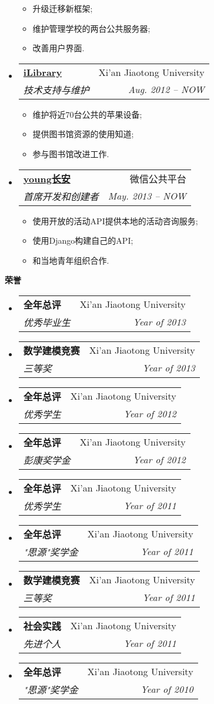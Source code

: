\documentclass[letterpaper,11pt]{article}
\makeatletter
\newcommand{\resitem}[1]{\item #1 \vspace{-2pt}}
\newcommand{\resheading}[1]{{\large \colorbox{mygrey}{\begin{minipage}{\textwidth}{\textbf{#1 \vphantom{p\^{E}}}}\end{minipage}}}}
\newcommand{\ressubheading}[4]{
\begin{tabular*}{6.5in}{l@{\extracolsep{\fill}}r}
		\textbf{#1} & #2 \\
		\textit{#3} & \textit{#4} \\
\end{tabular*}\vspace{-6pt}}
\makeatother
\begin{document}
\begin{CJK}{UTF8}{gbsn}
\begin{itemize}
				{ \footnotesize
				\begin{itemize}
					\resitem{升级迁移新框架;}
					\resitem{维护管理学校的两台公共服务器;}
					\resitem{改善用户界面.}
				\end{itemize}
				}
		\item 
			\ressubheading{\href{http://www.lib.xjtu.edu.cn/}{iLibrary}}{Xi'an Jiaotong University}{技术支持与维护}{Aug. 2012 -- NOW}
				{ \footnotesize
				\begin{itemize}
					\resitem{维护将近70台公共的苹果设备;}
					\resitem{提供图书馆资源的使用知道;}
					\resitem{参与图书馆改进工作.}
				\end{itemize}
				}
		\item 
			\ressubheading{\href{http://nanyang.xjtu.edu.cn/WeChat/note.html}{young长安}}{微信公共平台}{首席开发和创建者}{May. 2013 -- NOW}
				{ \footnotesize
				\begin{itemize}
					\resitem{使用开放的活动API提供本地的活动咨询服务;}
					\resitem{使用Django构建自己的API;}
					\resitem{和当地青年组织合作.}
				\end{itemize}
				}
	\end{itemize}	
	
\resheading{荣誉}
	\begin{itemize}
		\item
			\ressubheading{全年总评}{Xi'an Jiaotong University}{优秀毕业生}{Year of 2013}
		\item
			\ressubheading{数学建模竞赛}{Xi'an Jiaotong University}{三等奖}{Year of 2013}
		\item
			\ressubheading{全年总评}{Xi'an Jiaotong University}{优秀学生}{Year of 2012}
		\item
			\ressubheading{全年总评}{Xi'an Jiaotong University}{彭康奖学金}{Year of 2012}
		\item
			\ressubheading{全年总评}{Xi'an Jiaotong University}{优秀学生}{Year of 2011}
		\item
			\ressubheading{全年总评}{Xi'an Jiaotong University}{"思源"奖学金}{Year of 2011}
		\item
			\ressubheading{数学建模竞赛}{Xi'an Jiaotong University}{三等奖}{Year of 2011}
		\item
			\ressubheading{社会实践}{Xi'an Jiaotong University}{先进个人}{Year of 2011}
		\item
			\ressubheading{全年总评}{Xi'an Jiaotong University}{"思源"奖学金}{Year of 2010}
		\end{itemize}
	

\end{CJK}
\end{document}
